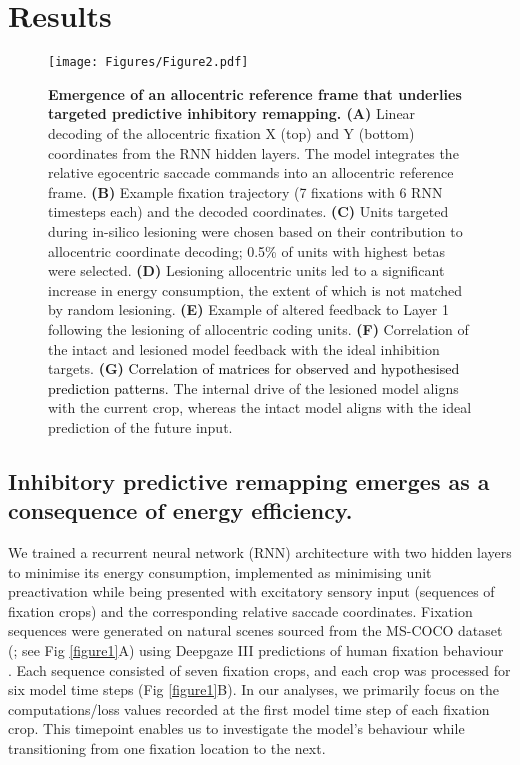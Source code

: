 \documentclass[10pt,letterpaper]{article}
\begin{document}
\section{Results}

\begin{figure*}[ht!]
\begin{center}
\texttt{[image: Figures/Figure2.pdf]}
\end{center}
\caption{\textbf{Emergence of an allocentric reference frame that underlies targeted predictive inhibitory remapping. (A)} Linear decoding of the allocentric fixation X (top) and Y (bottom) coordinates from the RNN hidden layers. The model integrates the relative egocentric saccade commands into an allocentric reference frame. \textbf{(B)} Example fixation trajectory (7 fixations with 6 RNN timesteps each) and the decoded coordinates. \textbf{(C)} Units targeted during in-silico lesioning were chosen based on their contribution to allocentric coordinate decoding; 0.5\% of units with highest betas were selected. \textbf{(D)} Lesioning allocentric units led to a significant increase in energy consumption, the extent of which is not matched by random lesioning. \textbf{(E)} Example of altered feedback to Layer 1 following the lesioning of allocentric coding units. \textbf{(F)} Correlation of the intact and lesioned model feedback with the ideal inhibition targets. \textbf{(G)} \textcolor{black}{ Correlation of matrices for observed and hypothesised prediction patterns.} The internal drive of the lesioned model aligns with the current crop, whereas the intact model aligns with the ideal prediction of the future input.} 
\label{figure3}
\end{figure*}

\subsection{Inhibitory predictive remapping emerges as a consequence of energy efficiency.}
We trained a recurrent neural network (RNN) architecture with two hidden layers to minimise its energy consumption, implemented as minimising unit preactivation \citep{ali_predictive_2022} while being presented with excitatory sensory input (sequences of fixation crops) and the corresponding relative saccade coordinates. Fixation sequences were generated on natural scenes sourced from the MS-COCO dataset (\citealp[]{lin_microsoft_2015}; see Fig \ref{figure1}A) using Deepgaze III predictions of human fixation behaviour \citep{kummerer_deepgaze_2022}. Each sequence consisted of seven fixation crops, and each crop was processed for six model time steps (Fig \ref{figure1}B). In our analyses, we primarily focus on the computations/loss values recorded at the first model time step of each fixation crop. This timepoint enables us to investigate the model's behaviour while transitioning from one fixation location to the next. 
\end{document}
